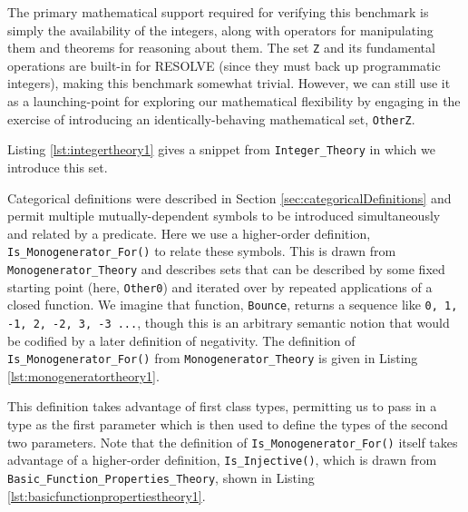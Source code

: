 The primary mathematical support required for verifying this benchmark is simply the availability of the integers, along with operators for manipulating them and theorems for reasoning about them.  The set \texttt{Z} and its fundamental operations are built-in for RESOLVE (since they must back up programmatic integers), making this benchmark somewhat trivial.  However, we can still use it as a launching-point for exploring our mathematical flexibility by engaging in the exercise of introducing an identically-behaving mathematical set, \texttt{OtherZ}.

Listing \ref{lst:integertheory1} gives a snippet from \texttt{Integer\_Theory} in which we introduce this set.



Categorical definitions were described in Section \ref{sec:categoricalDefinitions} and permit multiple mutually-dependent symbols to be introduced simultaneously and related by a predicate.  Here we use a higher-order definition, \texttt{Is\_Monogenerator\_For()} to relate these symbols.  This is drawn from \texttt{Monogenerator\_Theory} and describes sets that can be described by some fixed starting point (here, \texttt{Other0}) and iterated over by repeated applications of a closed function.  We imagine that function, \texttt{Bounce}, returns a sequence like \texttt{0, 1, -1, 2, -2, 3, -3 ...}, though this is an arbitrary semantic notion that would be codified by a later definition of negativity.  The definition of \texttt{Is\_Monogenerator\_For()} from \texttt{Monogenerator\_Theory} is given in Listing \ref{lst:monogeneratortheory1}.



This definition takes advantage of first class types, permitting us to pass in a type as the first parameter which is then used to define the types of the second two parameters.  Note that the definition of \texttt{Is\_Monogenerator\_For()} itself takes advantage of a higher-order definition, \texttt{Is\_Injective()}, which is drawn from \texttt{Basic\_Function\_Properties\_Theory}, shown in Listing \ref{lst:basicfunctionpropertiestheory1}.



